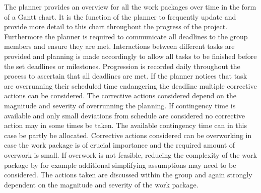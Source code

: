 The planner provides an overview for all the work packages over time in the form of a Gantt chart. It is the function of the planner to frequently update and provide more detail to this chart throughout the progress of the project. Furthermore the planner is required to communicate all deadlines to the group members and ensure they are met. Interactions between different tasks are provided and planning is made accordingly to allow all tasks to be finished before the set deadlines or milestones. Progression is recorded daily throughout the process to ascertain that all deadlines are met. If the planner notices that task are overrunning their scheduled time endangering the deadline multiple corrective actions can be considered. The corrective actions considered depend on the magnitude and severity of overrunning the planning. If contingency time is available and only small deviations from schedule are considered no corrective action may in some times be taken. The available contingency time can in this case be partly be allocated. Corrective actions considered can be overworking in case the work package is of crucial importance and the required amount of overwork is small. If overwork is not feasible, reducing the complexity of the work package by for example additional simplifying assumptions may need to be considered. The actions taken are discussed within the group and again strongly dependent on the magnitude and severity of the work package.



